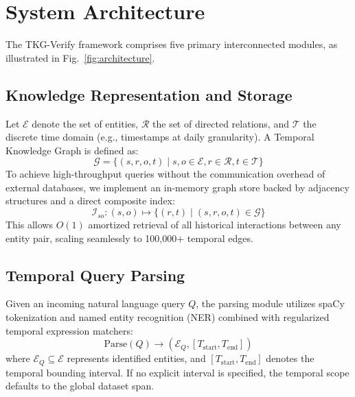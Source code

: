 \documentclass[conference]{IEEEtran}
\begin{document}
\section{System Architecture}
The TKG-Verify framework comprises five primary interconnected modules, as illustrated in Fig.~\ref{fig:architecture}.

\subsection{Knowledge Representation and Storage}
Let $\mathcal{E}$ denote the set of entities, $\mathcal{R}$ the set of directed relations, and $\mathcal{T}$ the discrete time domain (e.g., timestamps at daily granularity). A Temporal Knowledge Graph is defined as:
\begin{equation}
\mathcal{G} = \{(s, r, o, t) \mid s, o \in \mathcal{E}, r \in \mathcal{R}, t \in \mathcal{T}\}
\end{equation}
To achieve high-throughput queries without the communication overhead of external databases, we implement an in-memory graph store backed by adjacency structures and a direct composite index:
\begin{equation}
\mathcal{I}_{so}: (s, o) \mapsto \{(r, t) \mid (s, r, o, t) \in \mathcal{G}\}
\end{equation}
This allows $O(1)$ amortized retrieval of all historical interactions between any entity pair, scaling seamlessly to 100,000+ temporal edges.

\subsection{Temporal Query Parsing}
Given an incoming natural language query $Q$, the parsing module utilizes spaCy tokenization and named entity recognition (NER) combined with regularized temporal expression matchers:
\begin{equation}
\mathrm{Parse}(Q) \rightarrow \left(\mathcal{E}_Q, [T_{\mathrm{start}}, T_{\mathrm{end}}]\right)
\end{equation}
where $\mathcal{E}_Q \subseteq \mathcal{E}$ represents identified entities, and $[T_{\mathrm{start}}, T_{\mathrm{end}}]$ denotes the temporal bounding interval. If no explicit interval is specified, the temporal scope defaults to the global dataset span.
\end{document}

